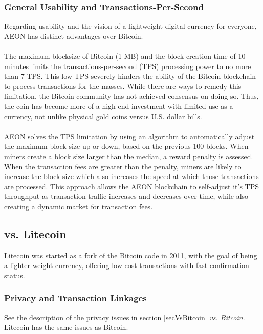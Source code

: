 \subsubsection{General Usability and Transactions-Per-Second}
Regarding usability and the vision of a lightweight digital currency for everyone, AEON has distinct advantages over Bitcoin.\\
\\
The maximum blocksize of Bitcoin (1 MB) and the block creation time of 10 minutes limits the transactions-per-second (TPS) processing power to no more than 7 TPS.  This low TPS severely hinders the ability of the Bitcoin blockchain to process transactions for the masses.  While there are ways to remedy this limitation, the Bitcoin community has not achieved consensus on doing so.  Thus, the coin has become more of a high-end investment with limited use as a currency, not unlike physical gold coins versus U.S. dollar bills.\\
\\
AEON solves the TPS limitation by using an algorithm to automatically adjust the maximum block size up or down, based on the previous 100 blocks.  When miners create a block size larger than the median, a reward penalty is assessed. When the transaction fees are greater than the penalty, miners are likely to increase the block size which also increases the speed at which those transactions are processed.  This approach allows the AEON blockchain to self-adjust it's TPS throughput as transaction traffic increases and decreases over time, while also creating a dynamic market for transaction fees.

\subsection{vs. Litecoin}
Litecoin was started as a fork of the Bitcoin code in 2011, with the goal of being a lighter-weight currency, offering low-cost transactions with fast confirmation status.

\subsubsection{Privacy and Transaction Linkages}
See the description of the privacy issues in section \ref{secVsBitcoin} \textit{vs. Bitcoin}. Litecoin has the same issues as Bitcoin.

